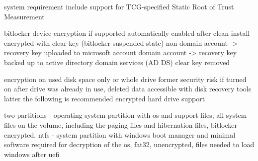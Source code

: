 system requirement
include support for TCG-specified Static Root of Trust Measurement

bitlocker device encryption if supported automatically enabled
after clean install encrypted with clear key (bitlocker suspended state)
non domain account -> recovery key uploaded to microsoft account
domain account -> recovery key backed up to active directory domain services (AD DS)
clear key removed

encryption on used disk space only or whole drive
former security risk if turned on after drive was already in use, deleted data accessible with disk recovery tools
latter the following is recommended
encrypted hard drive support

two partitions
- operating system partition with os and support files, all system files on the volume, including the paging files and hibernation files, bitlocker encrypted, ntfs
- system partition with windows boot manager and minimal software required for decryption of the os, fat32, unencrypted, files needed to load windows after uefi